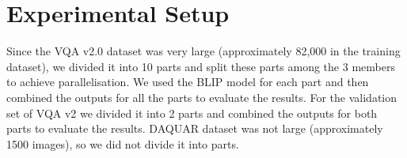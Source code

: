 \section{Experimental Setup}
\label{sec:formatting}
Since the VQA v2.0  dataset was very large (approximately 82,000 in the training dataset), we divided it into 10 parts and split these parts among the 3 members to achieve parallelisation. We used the BLIP model for each part and then combined the outputs for all the parts to evaluate the results.
For the validation set of VQA v2 we divided it into 2 parts and combined the outputs for both parts to evaluate the results.
DAQUAR dataset was not large (approximately 1500 images), so we did not divide it into parts.






